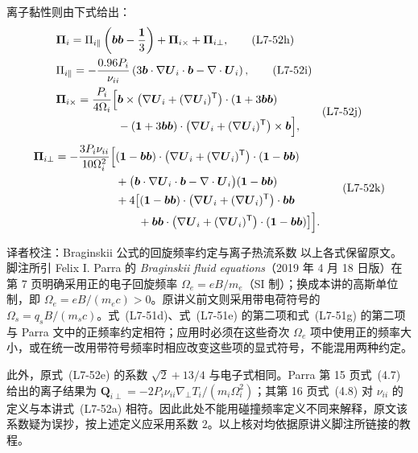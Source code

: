 离子黏性则由下式给出：
\begin{align}
&\boldsymbol\Pi_i=\Pi_{i\parallel}\left(\boldsymbol b\boldsymbol b-\frac{\boldsymbol1}3\right)
 +\boldsymbol\Pi_{i\times}+\boldsymbol\Pi_{i\perp},
 \tag{L7-52h}\label{eq:L7:52h}\\
&\Pi_{i\parallel}=-\frac{0.96P_i}{\nu_{ii}}
 \left(3\boldsymbol b\cdot\nabla\boldsymbol U_i\cdot\boldsymbol b-\nabla\cdot\boldsymbol U_i\right),
 \tag{L7-52i}\label{eq:L7:52i}\\
&\begin{aligned}
\boldsymbol\Pi_{i\times}
=\frac{P_i}{4\Omega_i}\Bigl[&\boldsymbol b\times
 \bigl(\nabla\boldsymbol U_i+(\nabla\boldsymbol U_i)^{\mathsf T}\bigr)
 \cdot(\boldsymbol1+3\boldsymbol b\boldsymbol b)\\
&-(\boldsymbol1+3\boldsymbol b\boldsymbol b)\cdot
 \bigl(\nabla\boldsymbol U_i+(\nabla\boldsymbol U_i)^{\mathsf T}\bigr)\times\boldsymbol b\Bigr],
\end{aligned}\tag{L7-52j}\label{eq:L7:52j}
\end{align}
\begin{equation}
\begin{aligned}
\boldsymbol\Pi_{i\perp}=-\frac{3P_i\nu_{ii}}{10\Omega_i^2}\Bigl[&
 (\boldsymbol1-\boldsymbol b\boldsymbol b)\cdot
 \bigl(\nabla\boldsymbol U_i+(\nabla\boldsymbol U_i)^{\mathsf T}\bigr)
 \cdot(\boldsymbol1-\boldsymbol b\boldsymbol b)\\
&+\bigl(\boldsymbol b\cdot\nabla\boldsymbol U_i\cdot\boldsymbol b
 -\nabla\cdot\boldsymbol U_i\bigr)(\boldsymbol1-\boldsymbol b\boldsymbol b)\\
&+4\bigl[(\boldsymbol1-\boldsymbol b\boldsymbol b)\cdot
 \bigl(\nabla\boldsymbol U_i+(\nabla\boldsymbol U_i)^{\mathsf T}\bigr)\cdot\boldsymbol b\boldsymbol b\\
&\qquad+\boldsymbol b\boldsymbol b\cdot
 \bigl(\nabla\boldsymbol U_i+(\nabla\boldsymbol U_i)^{\mathsf T}\bigr)
 \cdot(\boldsymbol1-\boldsymbol b\boldsymbol b)\bigr]\Bigr].
\end{aligned}\tag{L7-52k}\label{eq:L7:52k}
\end{equation}
\begin{correction}{译者校注：Braginskii 公式的回旋频率约定与离子热流系数}
以上各式保留原文。脚注所引 Felix I. Parra 的 \emph{Braginskii fluid equations}（2019 年 4 月 18 日版）在第 7 页明确采用正的电子回旋频率 $\Omega_e=eB/m_e$（SI 制）；换成本讲的高斯单位制，即 $\Omega_e=eB/(m_ec)>0$。原讲义前文则采用带电荷符号的 $\Omega_s=q_sB/(m_sc)$。式~(L7-51d)、式~(L7-51e) 的第二项和式~(L7-51g) 的第二项与 Parra 文中的正频率约定相符；应用时必须在这些奇次 $\Omega_e$ 项中使用正的频率大小，或在统一改用带符号频率时相应改变这些项的显式符号，不能混用两种约定。

此外，原式~(L7-52e) 的系数 $\sqrt2+13/4$ 与电子式相同。Parra 第 15 页式~(4.7) 给出的离子结果为 $\boldsymbol Q_{i\perp}=-2P_i\nu_{ii}\nabla_\perp T_i/(m_i\Omega_i^2)$；其第 16 页式~(4.8) 对 $\nu_{ii}$ 的定义与本讲式~(L7-52a) 相符。因此此处不能用碰撞频率定义不同来解释，原文该系数疑为误抄，按上述定义应采用系数 $2$。以上核对均依据原讲义脚注所链接的教程。
\end{correction}

